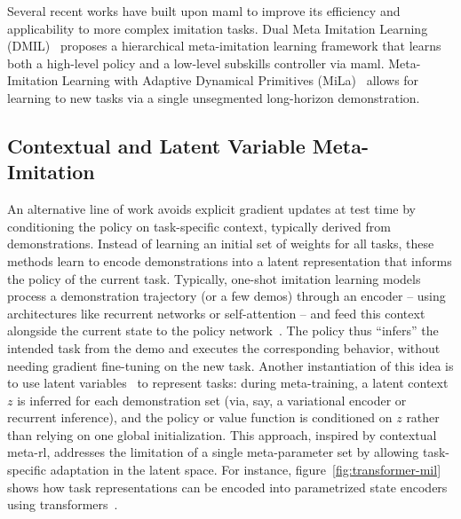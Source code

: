 Several recent works have built upon \acrshort{maml} to improve its efficiency and applicability to more complex imitation tasks.
Dual Meta Imitation Learning (DMIL)~\cite{gao2022transferring} proposes a hierarchical meta-imitation learning framework that learns both a high-level policy and a low-level subskills controller via \acrshort{maml}.
Meta-Imitation Learning with Adaptive Dynamical Primitives (MiLa)~\cite{Wu2024OneShotRI} allows for learning to new tasks via a single unsegmented long-horizon demonstration.

\subsection{Contextual and Latent Variable Meta-Imitation}\label{subsec:contextual-and-latent-variable-meta-imitation}

An alternative line of work avoids explicit gradient updates at test time by conditioning the policy on task-specific context, typically derived from demonstrations.
Instead of learning an initial set of weights for all tasks, these methods learn to encode demonstrations into a latent representation that informs the policy of the current task.
Typically, one-shot imitation learning models process a demonstration trajectory (or a few demos) through an encoder – using architectures like recurrent networks or self-attention – and feed this context alongside the current state to the policy network~\cite{Duan2017OneShotIL}.
The policy thus “infers” the intended task from the demo and executes the corresponding behavior, without needing gradient fine-tuning on the new task.
Another instantiation of this idea is to use latent variables~\cite{sontakke2023roboclip, NEURIPS2019_2b8f621e, NEURIPS2019_30de2428, 10.3389/frobt.2020.606361, Bhoopchand2023LearningFI} to represent tasks: during meta-training, a latent context $z$ is inferred for each demonstration set (via, say, a variational encoder or recurrent inference), and the policy or value function is conditioned on $z$ rather than relying on one global initialization.
This approach, inspired by contextual meta-\acrshort{rl}, addresses the limitation of a single meta-parameter set by allowing task-specific adaptation in the latent space.
For instance, figure~\ref{fig:transformer-mil} shows how task representations can be encoded into parametrized state encoders using transformers~\cite{cho2024metacontroller}.

